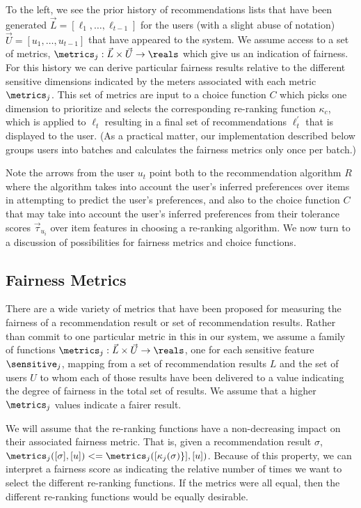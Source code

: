 To the left, we see the prior history of recommendations lists that have been generated $\vec{L} = [\ell_1, \ldots, \ell_{t-1}]$ for the users (with a slight abuse of notation) $\vec{U} = [u_1, \ldots, u_{t-1} ]$ that have appeared to the system.  We assume access to a set of metrics, $\metrics_j: \vec{L} \times \vec{U} \rightarrow \reals$ which give us an indication of fairness.  For this history we can derive particular fairness results relative to the different sensitive dimensions indicated by the meters associated with each metric $\metrics_j$. This set of metrics are input to a choice function $C$ which picks one dimension to prioritize and selects the corresponding re-ranking function $\kappa_c$, which is applied to $\ell_t$ resulting in a final set of recommendations $\ell^{\prime}_t$ that is displayed to the user. (As a practical matter, our implementation described below groups users into batches and calculates the fairness metrics only once per batch.)

Note the arrows from the user $u_t$ point both to the recommendation algorithm $R$ where the algorithm takes into account the user's inferred preferences over items in attempting to predict the user's preferences, and also to the choice function $C$ that may take into account the user's inferred preferences from their tolerance scores $\vec{\tau}_{u_i}$ over item features in choosing a re-ranking algorithm.  We now turn to a discussion of possibilities for fairness metrics and choice functions.

\subsection{Fairness Metrics}
There are a wide variety of metrics that have been proposed for measuring the fairness of a recommendation result or set of recommendation results. Rather than commit to one particular metric in this in our system, we assume a family of functions $\metrics_j: \vec{L} \times \vec{U} \rightarrow \reals$, one for each sensitive feature $\sensitive_j$, mapping from a set of recommendation results $L$ and the set of users $U$ to whom each of those results have been delivered to a value indicating the degree of fairness in the total set of results. We assume that a higher $\metrics_j$ values indicate a fairer result. 

We will assume that the re-ranking functions have a non-decreasing impact on their associated fairness metric. That is, given a recommendation result $\sigma$, $\metrics_j([\sigma], [u]) <=  \metrics_j([\kappa_j(\sigma)\}], [u])$.  Because of this property, we can interpret a fairness score as indicating the relative number of times we want to select the different re-ranking functions. If the metrics were all equal, then the different re-ranking functions would be equally desirable.

